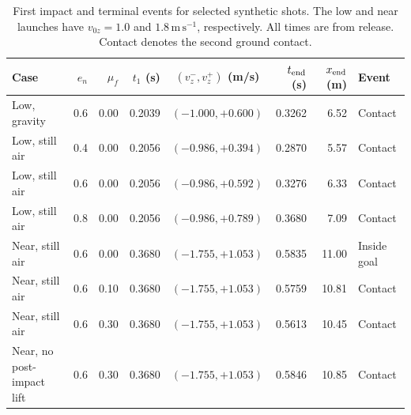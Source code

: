 \begin{table}[!htbp]
\centering
\caption{First impact and terminal events for selected synthetic shots.
The low and near launches have \(v_{0z}=1.0\) and \(1.8\,\mathrm{m\,s^{-1}}\),
respectively. All times are from release. Contact denotes the second
ground contact.}
\label{tab:part7-events}
\small
\setlength{\tabcolsep}{4pt}
\begin{tabular}{@{}lrrrcrrl@{}}
\toprule
Case & \(e_n\) & \(\mu_f\) & \(t_1\) (s) &
\((v_z^-,v_z^+)\) (m/s) & \(t_{\rm end}\) (s) & \(x_{\rm end}\) (m) & Event \\
\midrule
Low, gravity & 0.6 & 0.00 & 0.2039 & \((-1.000, +0.600)\) & 0.3262 & 6.52 & Contact \\
Low, still air & 0.4 & 0.00 & 0.2056 & \((-0.986, +0.394)\) & 0.2870 & 5.57 & Contact \\
Low, still air & 0.6 & 0.00 & 0.2056 & \((-0.986, +0.592)\) & 0.3276 & 6.33 & Contact \\
Low, still air & 0.8 & 0.00 & 0.2056 & \((-0.986, +0.789)\) & 0.3680 & 7.09 & Contact \\
Near, still air & 0.6 & 0.00 & 0.3680 & \((-1.755, +1.053)\) & 0.5835 & 11.00 & Inside goal \\
Near, still air & 0.6 & 0.10 & 0.3680 & \((-1.755, +1.053)\) & 0.5759 & 10.81 & Contact \\
Near, still air & 0.6 & 0.30 & 0.3680 & \((-1.755, +1.053)\) & 0.5613 & 10.45 & Contact \\
Near, no post-impact lift & 0.6 & 0.30 & 0.3680 & \((-1.755, +1.053)\) & 0.5846 & 10.85 & Contact \\
\bottomrule
\end{tabular}
\end{table}
